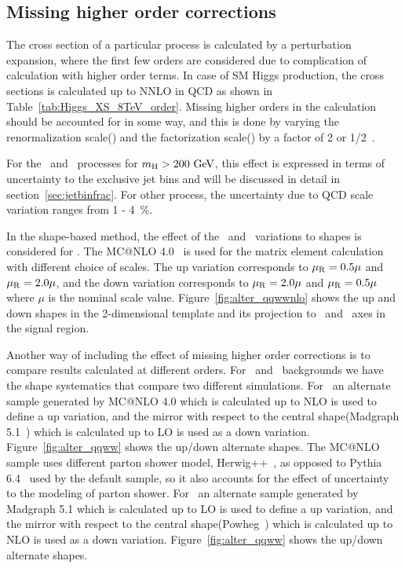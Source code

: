 \subsection{Missing higher order corrections} 

The cross section of a particular process is calculated by a perturbation expansion, 
where the first few orders are considered due to complication of calculation 
with higher order terms. In case of SM Higgs production, the cross sections is calculated 
up to NNLO in QCD as shown in Table~\ref{tab:Higgs_XS_8TeV_order}. Missing higher orders 
in the calculation should be accounted for in some way, and this is done by 
varying the renormalization scale(\mR) and the factorization scale(\mF) 
by a factor of 2 or 1/2~\cite{Dittmaier:1318996}. 

For the \ggH\ and \qqww\ processes for $m_{\mathrm{H}}>200~\mathrm{Ge\kern -0.1em V}$, 
this effect is expressed in terms of uncertainty to the 
exclusive jet bins and will be discussed in detail in section~\ref{sec:jetbinfrac}. 
For other process, the uncertainty due to QCD scale variation ranges from 1 - 4~\%.   

In the shape-based method, the effect of the \mR\ and \mF\ variations to shapes 
is considered for \qqww. The MC@NLO 4.0~\cite{Frixione:2002ik} is used for the matrix element calculation 
with different choice of scales. The up variation corresponds to $\mu_\mathrm{R}=0.5\mu$ and $\mu_\mathrm{R}=2.0\mu$,
and the down variation corresponds to $\mu_\mathrm{R}=2.0\mu$ and $\mu_\mathrm{R}=0.5\mu$ where $\mu$ is the nominal 
scale value. Figure~\ref{fig:alter_qqwwnlo} shows the up and down  
shapes in the 2-dimensional template and its projection to \mT\ and \mll\ axes
in the signal region.

Another way of including the effect of missing higher order corrections 
is to compare results calculated at different orders. For \qqww\ and \topbkg\ 
backgrounds we have the shape systematics that compare two different simulations. 
For \qqww\ an alternate sample generated by MC@NLO 4.0 which is calculated up to NLO
is used to define a up variation, 
and the mirror with respect to the central shape(Madgraph 5.1~\cite{Madgraph5p1}) which is calculated up to LO 
is used as a down variation.
Figure~\ref{fig:alter_qqww} shows the up/down alternate shapes. 
The MC@NLO sample uses different parton shower model, Herwig++~\cite{Corcella:2000bw}, 
as opposed to 
Pythia 6.4~\cite{Sjostrand:2006za} used by the default sample, 
so it also accounts for the effect of uncertainty 
to the modeling of parton shower. 
For \topbkg\ an alternate sample generated by Madgraph 5.1 which is calculated up to LO
is used to define a up variation,
and the mirror with respect to the central shape(Powheg~\cite{Frixione:2007vw}) which is calculated up to NLO 
is used as a down variation.
Figure~\ref{fig:alter_qqww} shows the up/down alternate shapes. 

